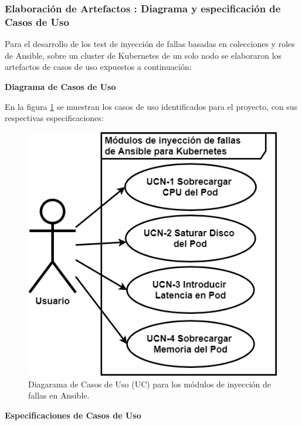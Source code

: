 \subsubsection{Elaboración de Artefactos : Diagrama y especificación de Casos de Uso}
\par Para el desarrollo de los test de inyección de fallas basadas en colecciones y roles de Ansible, sobre un cluster de Kubernetes de un solo nodo se elaboraron los artefactos de casos de uso expuestos a continuación:\\


\par \textbf{Diagrama de Casos de Uso}\\


\par En la figura \ref{fig:uc01} se muestran los casos de uso identificados para el proyecto, con sus respectivas especificaciones:

\begin{figure}[htpb!]
	\centering
	\includegraphics[width=0.43\columnwidth]{images/usecase/ucfaultinjectionF.png}
	\caption{Diagarama de Casos de Uso (UC) para los módulos de inyección de fallas en Ansible.}
	\label{fig:uc01}
\end{figure}

\textbf{Especificaciones de Casos de Uso}\\

